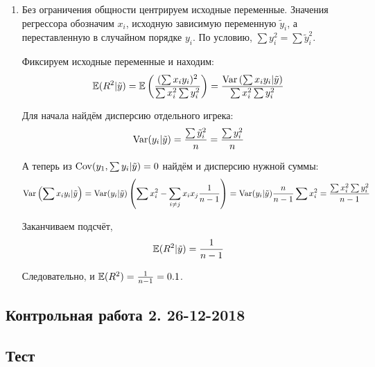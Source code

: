 \begin{enumerate}
\item Без ограничения общности центрируем исходные переменные.
Значения регрессора обозначим $x_i$, исходную зависимую переменную $\tilde{y}_i$,
а переставленную в случайном порядке $y_i$.
По условию, $\sum y_i^2 = \sum \tilde{y}_i^2$.

Фиксируем исходные переменные и находим:
\[
\mathbb{E}(R^2 | \tilde{y}) = \mathbb{E}\left( \frac{(\sum x_i y_i )^2}{\sum x_i^2 \sum y_i^2}  \right) =
\frac{\operatorname{Var}\left(\sum x_i y_i | \tilde{y}\right)}{\sum x_i^2 \sum y_i^2}
\]

Для начала найдём дисперсию отдельного игрека:
\[
\operatorname{Var}(y_i | \tilde{y}) = \frac{\sum \tilde{y}_i^2}{n} = \frac{\sum y_i^2}{n}
\]

А теперь из $\operatorname{Cov}(y_1, \sum y_i | \tilde{y}) =0$ найдём и дисперсию нужной суммы:
\[
\operatorname{Var}\left(\sum x_i y_i | \tilde{y}\right) =
\operatorname{Var}(y_i | \tilde{y}) \left(  \sum x_i^2 - \sum_{i\neq j} x_i x_j \frac{1}{n-1}  \right) =
\operatorname{Var}(y_i | \tilde{y}) \frac{n}{n-1} \sum x_i^2 = \frac{\sum x_i^2 \sum y_i^2 }{n-1}
\]

Заканчиваем подсчёт,
\[
\mathbb{E}(R^2 | \tilde{y}) = \frac{1}{n-1}
\]

Следовательно, и $\mathbb{E}(R^2) = \frac{1}{n-1} = 0.1$.

\end{enumerate}


\subsection{Контрольная работа 2. 26-12-2018}

\subsection*{Тест}












